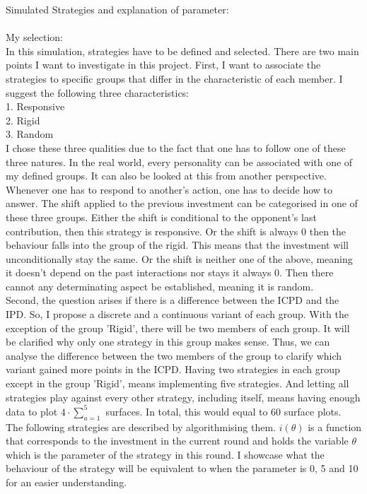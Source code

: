 \documentclass{article}
\begin{document}
Simulated Strategies and explanation of parameter:\\
		\\My selection:\\
In this simulation, strategies have to be defined and selected.
There are two main points I want to investigate in this project.
First, I want to associate the strategies to specific groups that differ in the characteristic of each member.
I suggest the following three characteristics:
\\1. Responsive
\\2. Rigid
\\3. Random\\
I chose these three qualities due to the fact that one has to follow one of these three natures.
In the real world, every personality can be associated with one of my defined groups.
It can also be looked at this from another perspective.
Whenever one has to respond to another's action, one has to decide how to answer.
The shift applied to the previous investment can be categorised in one of these three groups.
Either the shift is conditional to the opponent's last contribution, then this strategy is responsive.
Or the shift is always 0 then the behaviour falls into the group of the rigid.
This means that the investment will unconditionally stay the same.
Or the shift is neither one of the above, meaning it doesn't depend on the past interactions nor stays it always 0.
Then there cannot any determinating aspect be established, meaning it is random.
\\Second, the question arises if there is a difference between the ICPD and the IPD.
So, I propose a discrete and a continuous variant of each group.
With the exception of the group 'Rigid', there will be two members of each group.
It will be clarified why only one strategy in this group makes sense.
Thus, we can analyse the difference between the two members of the group to clarify which variant gained more points in the ICPD.
Having two strategies in each group except in the group 'Rigid', means implementing five strategies.
And letting all strategies play against every other strategy, including itself, means having enough data to plot $4 \cdot \sum_{a=1}^{5}$ surfaces.
In total, this would equal to 60 surface plots.\\
The following strategies are described by algorithmising them.
$i(\theta)$ is a function that corresponds to the investment in the current round and holds the variable $\theta$ which is the parameter of the strategy in this round.
I showcase what the behaviour of the strategy will be equivalent to when the parameter is 0, 5 and 10 for an easier understanding.\\
\end{document}
